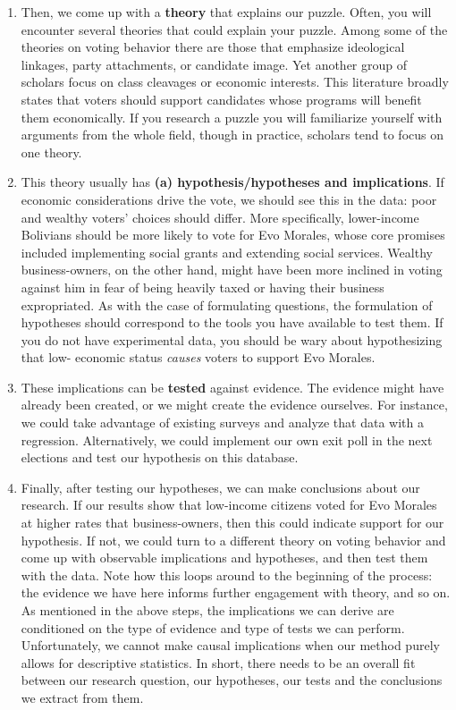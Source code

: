 \documentclass{book}
\begin{document}
\begin{enumerate}
\def\labelenumi{\arabic{enumi}.}
\setcounter{enumi}{1}
\item
  Then, we come up with a \textbf{theory} that explains our puzzle. Often, you
  will encounter several theories that could explain your puzzle. Among some
  of the theories on voting behavior there are those that emphasize
  ideological linkages, party attachments, or candidate image. Yet another
  group of scholars focus on class cleavages or economic interests. This
  literature broadly states that voters should support candidates whose
  programs will benefit them economically. If you research a puzzle you will
  familiarize yourself with arguments from the whole field, though in
  practice, scholars tend to focus on one theory.
\item
  This theory usually has \textbf{(a) hypothesis/hypotheses and implications}.
  If economic considerations drive the vote, we should see this in the data:
  poor and wealthy voters' choices should differ. More specifically,
  lower-income Bolivians should be more likely to vote for Evo Morales, whose
  core promises included implementing social grants and extending social
  services. Wealthy business-owners, on the other hand, might have been more
  inclined in voting against him in fear of being heavily taxed or having
  their business expropriated. As with the case of formulating questions, the
  formulation of hypotheses should correspond to the tools you have available
  to test them. If you do not have experimental data, you should be wary about
  hypothesizing that low- economic status \emph{causes} voters to support Evo
  Morales.
\item
  These implications can be \textbf{tested} against evidence. The evidence
  might have already been created, or we might create the evidence ourselves.
  For instance, we could take advantage of existing surveys and analyze that
  data with a regression. Alternatively, we could implement our own exit poll
  in the next elections and test our hypothesis on this database.
\item
  Finally, after testing our hypotheses, we can make conclusions about our
  research. If our results show that low-income citizens voted for Evo Morales
  at higher rates that business-owners, then this could indicate support for
  our hypothesis. If not, we could turn to a different theory on voting
  behavior and come up with observable implications and hypotheses, and then
  test them with the data. Note how this loops around to the beginning of the
  process: the evidence we have here informs further engagement with theory,
  and so on. As mentioned in the above steps, the implications we can derive
  are conditioned on the type of evidence and type of tests we can perform.
  Unfortunately, we cannot make causal implications when our method purely
  allows for descriptive statistics. In short, there needs to be an overall
  fit between our research question, our hypotheses, our tests and the
  conclusions we extract from them.
\end{enumerate}
\end{document}
